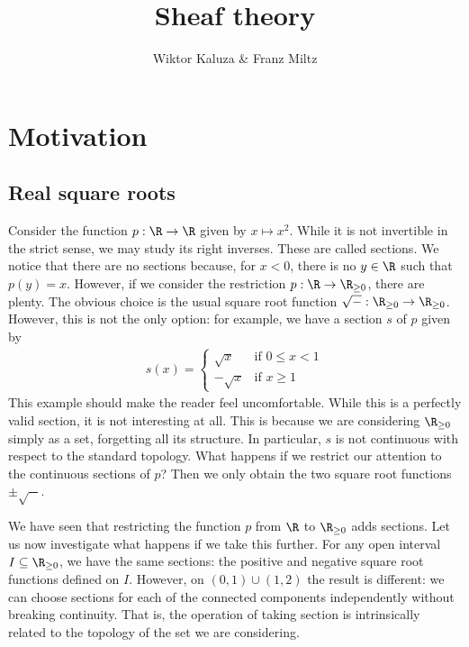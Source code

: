 \documentclass{article}
\author{Wiktor Kaluza \& Franz Miltz}
\title{Sheaf theory}
\begin{document}
\maketitle
\tableofcontents
\pagebreak

\section{Motivation}\label{sec:motivation}

\subsection{Real square roots}

Consider the function $p:\R\to\R$ given by $x\mapsto x^2$. While it is
not invertible in the strict sense, we may study its right inverses.
These are called sections. We notice that there are no sections because,
for $x < 0$, there is no $y\in\R$ such that $p(y) = x$. However,
if we consider the restriction $p:\R\to\R_{\geq 0}$, there are plenty.
The obvious choice is the usual square root function
$\sqrt{-} : \R_{\geq 0} \to \R_{\geq 0}$. However, this is not the only option:
for example, we have a section $s$ of $p$ given by
\begin{align*}
  s(x) = \begin{cases}
    \sqrt{x} & \text{if }0 \leq x<1 \\
    -\sqrt{x} & \text{if }x\geq 1
  \end{cases}
\end{align*}
This example should make the reader feel uncomfortable. While this is
a perfectly valid section, it is not interesting at all. This is because
we are considering $\R_{\geq 0}$ simply as a set, forgetting all its
structure. In particular, $s$ is not continuous with respect to the
standard topology.
What happens if we restrict our attention to the continuous sections
of $p$? Then we only obtain the two square root functions $\pm\sqrt{-}$.

We have seen that restricting the function $p$ from $\R$ to $\R_{\geq 0}$
adds sections. Let us now investigate what happens if we take this further.
For any open interval $I\subseteq\R_{\geq 0}$, we have the same sections:
the positive and negative square root functions defined on $I$. However,
on $(0,1)\cup(1,2)$ the result is different: we can choose sections for
each of the connected components independently without breaking continuity.
That is, the operation of taking section is intrinsically related to
the topology of the set we are considering.
\end{document}
